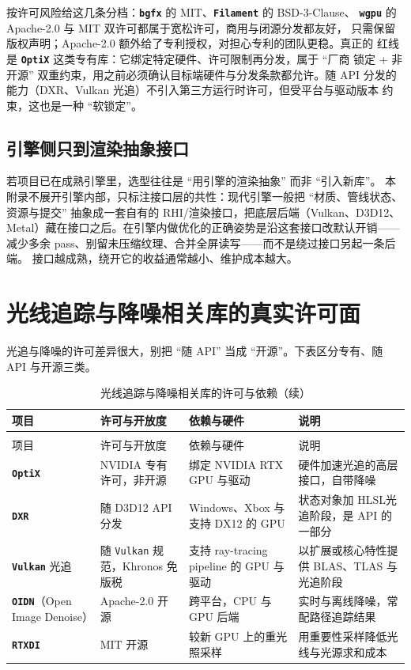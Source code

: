 \documentclass[12pt,a4paper,fontset=fandol]{ctexbook}
\newcommand{\Tp}[1]{\texttt{#1}}
\newcommand{\Lib}[1]{\textbf{\texttt{#1}}}
\newcommand{\Lang}[1]{\textsf{#1}}
\newcommand{\HSL}{\Lang{HLSL}}
\begin{document}
按许可风险给这几条分档：\Lib{bgfx} 的 MIT、\Lib{Filament} 的 BSD-3-Clause、
\Lib{wgpu} 的 Apache-2.0 与 MIT 双许可都属于宽松许可，商用与闭源分发都友好，
只需保留版权声明；Apache-2.0 额外给了专利授权，对担心专利的团队更稳。真正的
红线是 \Lib{OptiX} 这类专有库：它绑定特定硬件、许可限制再分发，属于 ``厂商
锁定 + 非开源'' 双重约束，用之前必须确认目标端硬件与分发条款都允许。随 API
分发的能力（DXR、Vulkan 光追）不引入第三方运行时许可，但受平台与驱动版本
约束，这也是一种 ``软锁定''。

\subsection{引擎侧只到渲染抽象接口}

若项目已在成熟引擎里，选型往往是 ``用引擎的渲染抽象'' 而非 ``引入新库''。
本附录不展开引擎内部，只标注接口层的共性：现代引擎一般把 ``材质、管线状态、
资源与提交'' 抽象成一套自有的 RHI/渲染接口，把底层后端（Vulkan、D3D12、
Metal）藏在接口之后。在引擎内做优化的正确姿势是沿这套接口改默认开销——
减少多余 pass、别留未压缩纹理、合并全屏读写——而不是绕过接口另起一条后端。
接口越成熟，绕开它的收益通常越小、维护成本越大。

\section{光线追踪与降噪相关库的真实许可面}

光追与降噪的许可差异很大，别把 ``随 API'' 当成 ``开源''。下表区分专有、随 API
与开源三类。

\begin{longtable}{>{\raggedright\arraybackslash}p{}
                  >{\raggedright\arraybackslash}p{}
                  >{\raggedright\arraybackslash}p{}
                  >{\raggedright\arraybackslash}p{}}
\caption{光线追踪与降噪相关库的许可与依赖}\label{tab:apC-rt} \\
\toprule
项目 & 许可与开放度 & 依赖与硬件 & 说明 \\
\midrule
\endfirsthead
\caption[]{光线追踪与降噪相关库的许可与依赖（续）}\\
\toprule
项目 & 许可与开放度 & 依赖与硬件 & 说明 \\
\midrule
\endhead
\bottomrule
\endfoot
\Lib{OptiX} & NVIDIA 专有许可，非开源 & 绑定 NVIDIA RTX GPU 与驱动 & 硬件加速光追的高层接口，自带降噪 \\
\Lib{DXR} & 随 D3D12 API 分发 & Windows、Xbox 与支持 DX12 的 GPU & 状态对象加 \HSL 光追阶段，是 API 的一部分 \\
\Lib{Vulkan} 光追 & 随 \Tp{Vulkan} 规范，Khronos 免版税 & 支持 ray-tracing pipeline 的 GPU 与驱动 & 以扩展或核心特性提供 BLAS、TLAS 与光追阶段 \\
\Lib{OIDN}（Open Image Denoise） & Apache-2.0 开源 & 跨平台，CPU 与 GPU 后端 & 实时与离线降噪，常配路径追踪结果 \\
\Lib{RTXDI} & MIT 开源 & 较新 GPU 上的重光照采样 & 用重要性采样降低光线与光源求和成本 \\
\end{longtable}
\end{document}
